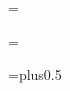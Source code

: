 \def\vspace{\par\begingroup\afterassignment\@vspace\skip0=}
\def\@vspace{\ifdim\lastskip<\skip0 \removelastskip\vskip\skip0\fi\endgroup}

\newif\ifinfloat \infloatfalse
\newif\ifnomargin \nomarginfalse

\def\nomargin{\nomargintrue}


%
%

\newif\iftitle \titlefalse
\newif\ifblank \blankfalse

\newtoks\foottoks
\newif\ifonefoot \onefootfalse

\def\onefoot#1{\onefoottrue\foottoks={#1}}

\def\rcsid$#1${\onefoot{{\tensf\$#1\$}}}

\headline={\ifblank\hfil\else\iftitle\hfil\else
  \ifodd\pageno\rightheadline\else\leftheadline\fi\fi\fi}

\footline={%
  \ifblank \hfil 
  \else\iftitle \ifodd\pageno\rightnumfoot\else\leftnumfoot\fi 
  \else \theonefoot \fi\fi}

\def\theonefoot{\ifonefoot \the\foottoks\hfil \global\onefootfalse \fi}

\def\leftheadline{\tenit\thepageno\quad\lhead\hfill}
\def\rightheadline{\hfill\tenit\rhead\quad\thepageno}

\def\leftnumfoot{\tenit\thepageno\hfil\theonefoot}
\def\rightnumfoot{\theonefoot\hfil\tenit\thepageno}

\def\lhead{} %
\def\rhead{\firstmark} %

\def\thepageno{\folio}


%
%

\skip\footins=\grid plus0.5\grid
\dimen{}\grid
\count{}

\def\footnote{\fnmark\fntext}

\def\footnum{$^{\number\footcnt}$}

\def\fnmark{\edef\@sf{\spacefactor\the\spacefactor}%
  \global\advance\footcnt by1
  \hyperanchor@\fntag{fn}%
  \hyperlink{\fntag a}{\footnum}\@sf}

\def\fntext{\insert\footins\bgroup\eightpoint
  \interlinepenalty=\interfootnotelinepenalty
  \let\par=\endgraf
  \leftskip=0pt \rightskip=0pt
  \splittopskip=\ht\strutbox %
  \splitmaxdepth=\dp\strutbox \floatingpenalty=20000
  \noindent 
  \hyperanchor{\fntag a}\hyperlink\fntag{\footnum}\enspace
  \bgroup\strut
  \aftergroup\@foot\let\next}
\def\@foot{\strut\egroup}


